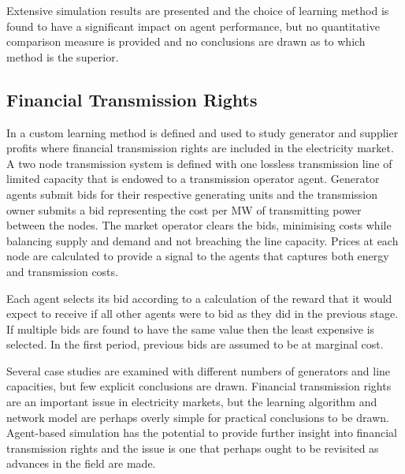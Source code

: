 Extensive simulation results are presented and the choice of learning method is
found to have a significant impact on agent performance, but no quantitative
comparison measure is provided and no conclusions are drawn as to which method
is the superior.

\subsection{Financial Transmission Rights}
In  a custom learning method is defined and used to study
generator and supplier profits where financial transmission rights are included
in the electricity market.  A two node transmission system is defined with one
lossless transmission line of limited capacity that is endowed to a transmission
operator agent.  Generator agents submit bids for their respective generating
units and the transmission owner submits a bid representing the cost per MW of
transmitting power between the nodes.  The market operator clears the bids,
minimising costs while balancing supply and demand and not breaching the line
capacity.  Prices at each node are calculated to provide a signal to the
agents that captures both energy and transmission costs.


Each agent selects its bid according to a calculation of the reward that it
would expect to receive if all other agents were to bid as they did in the previous stage.  If multiple bids are found to have
the same value then the least expensive is selected.  In the first period,
previous bids are assumed to be at marginal cost.

Several case studies are
examined with different numbers of generators and line capacities, but few
explicit conclusions are drawn.  Financial transmission rights are an
important issue in electricity markets, but the learning algorithm and
network model are perhaps overly simple for practical conclusions to be drawn.
Agent-based simulation has the potential to provide further insight into
financial transmission rights and the issue is one that perhaps ought to be
revisited as advances in the field are made.


